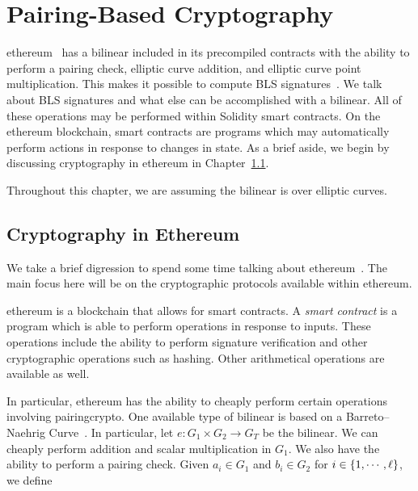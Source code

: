 \chapter{Pairing-Based Cryptography}
\label{chap:pairing}

\Gls{ethereum}~\cite{EthereumYellowpaper} has a \gls{bilinear}
included in its precompiled contracts
with the ability to perform a pairing check, elliptic curve addition,
and elliptic curve point multiplication.
This makes it possible to compute BLS signatures~\cite{BLSSignatures}.
We talk about BLS signatures and what else can be accomplished
with a \gls{bilinear}.
All of these operations may be performed within Solidity
\glspl{smart contract}.
On the \gls{ethereum} blockchain, \glspl{smart contract} are programs
which may automatically perform actions in response
to changes in state.
As a brief aside, we begin by discussing cryptography in \gls{ethereum} in 
Chapter~\ref{sec:pairing_ethereum}.

Throughout this chapter, we are assuming the \gls{bilinear}
is over \glspl{elliptic curve}.



\section{Cryptography in Ethereum}
\label{sec:pairing_ethereum}

We take a brief digression to spend some time talking about
\gls{ethereum}~\cite{EthereumYellowpaper}.
The main focus here will be on the cryptographic protocols
available within \gls{ethereum}.

\Gls{ethereum} is a blockchain that allows for \glspl{smart contract}.
A \emph{\gls{smart contract}} is a program which is able to perform
operations in response to inputs.
These operations include the ability to perform signature verification
and other cryptographic operations such as hashing.
Other arithmetical operations are available as well.

In particular, \gls{ethereum} has the ability to cheaply perform
certain operations involving \gls{pairingcrypto}.
One available type of \gls{bilinear} is based on a
Barreto--Naehrig Curve~\cite{BNCurves2005}.
In particular, let $e:G_{1}\times G_{2}\to G_{T}$ be the \gls{bilinear}.
We can cheaply perform addition and scalar multiplication in $G_{1}$.
We also have the ability to perform a pairing check.
Given $a_{i}\in G_{1}$ and $b_{i}\in G_{2}$ for $i\in\left\{ 1,\cdots,\ell \right\}$,
we define

